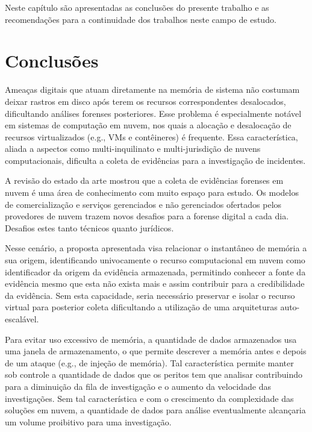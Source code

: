 %
Neste capítulo são apresentadas as conclusões do presente trabalho e as recomendações para a continuidade dos trabalhos neste campo de estudo.

\section{Conclusões}
\label{sec:proposta-concl}

%
Ameaças digitais que atuam diretamente na memória de sistema não costumam deixar rastros em disco após terem os recursos correspondentes desalocados, dificultando análises forenses posteriores.
%
Esse problema é especialmente notável em sistemas de computação em nuvem, nos quais a alocação e desalocação de recursos virtualizados (e.g., VMs e contêineres) é frequente.
%
Essa característica, aliada a aspectos como multi-inquilinato e multi-jurisdição de nuvens computacionais, dificulta a coleta de evidências para a investigação de incidentes.
%

A revisão do estado da arte mostrou que a coleta de evidências forenses em nuvem é uma área de conhecimento com muito espaço para estudo.
%
Os modelos de comercialização e serviços gerenciados e não gerenciados ofertados pelos provedores de nuvem trazem novos desafios para a forense digital a cada dia.
%
Desafios estes tanto técnicos quanto jurídicos.
%

Nesse cenário, a proposta apresentada visa relacionar o instantâneo de memória a sua origem, identificando univocamente o recurso computacional em nuvem como identificador da origem da evidência armazenada, permitindo conhecer a fonte da evidência mesmo que esta não exista mais e assim contribuir para a credibilidade da evidência.
%
Sem esta capacidade, seria necessário preservar e isolar o recurso virtual para posterior coleta dificultando a utilização de uma arquiteturas auto-escalável.
%

Para evitar uso excessivo de memória, a quantidade de dados armazenados usa uma janela de armazenamento, o que permite descrever a memória antes e depois de um ataque (e.g., de injeção de memória). 
%
Tal característica permite manter sob controle a quantidade de dados que os peritos tem que analisar contribuindo para a diminuição da fila de investigação e o aumento da velocidade das investigações.
%
Sem tal característica e com o crescimento da complexidade das soluções em nuvem, a quantidade de dados para análise eventualmente alcançaria um volume proibitivo para uma investigação.
%


